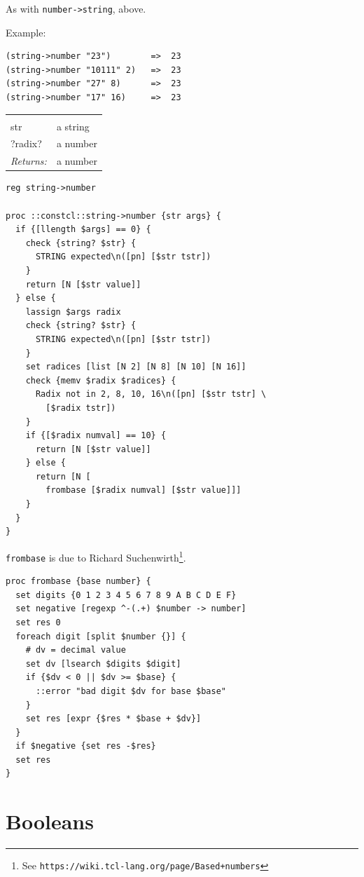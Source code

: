 \documentclass[twoside]{report}
\begin{document}
As with \texttt{number->string}, above.

Example:

\begin{verbatim}
(string->number "23")        =>  23
(string->number "10111" 2)   =>  23
(string->number "27" 8)      =>  23
(string->number "17" 16)     =>  23
\end{verbatim}

\noindent\begin{tabular}{ |p{1.9cm} p{8cm}| }
\hline
\rowcolor[HTML]{CCCCCC} \multicolumn{2}{|l|}{\bf string->number (public)} \\
str & a string \\
?radix? & a number \\
\textit{Returns:} & a number \\
\hline
\end{tabular}

\begin{lstlisting}
reg string->number

proc ::constcl::string->number {str args} {
  if {[llength $args] == 0} {
    check {string? $str} {
      STRING expected\n([pn] [$str tstr])
    }
    return [N [$str value]]
  } else {
    lassign $args radix
    check {string? $str} {
      STRING expected\n([pn] [$str tstr])
    }
    set radices [list [N 2] [N 8] [N 10] [N 16]]
    check {memv $radix $radices} {
      Radix not in 2, 8, 10, 16\n([pn] [$str tstr] \
        [$radix tstr])
    }
    if {[$radix numval] == 10} {
      return [N [$str value]]
    } else {
      return [N [
        frombase [$radix numval] [$str value]]]
    }
  }
}
\end{lstlisting}

\texttt{frombase} is due to Richard Suchenwirth\footnote{See \texttt{https://wiki.tcl-lang.org/page/Based+numbers}}.
\index{frombase procedure}

\begin{lstlisting}
proc frombase {base number} {
  set digits {0 1 2 3 4 5 6 7 8 9 A B C D E F}
  set negative [regexp ^-(.+) $number -> number]
  set res 0
  foreach digit [split $number {}] {
    # dv = decimal value
    set dv [lsearch $digits $digit]
    if {$dv < 0 || $dv >= $base} {
      ::error "bad digit $dv for base $base"
    }
    set res [expr {$res * $base + $dv}]
  }
  if $negative {set res -$res}
  set res
}
\end{lstlisting}

\section{Booleans}
\label{booleans}
\end{document}

